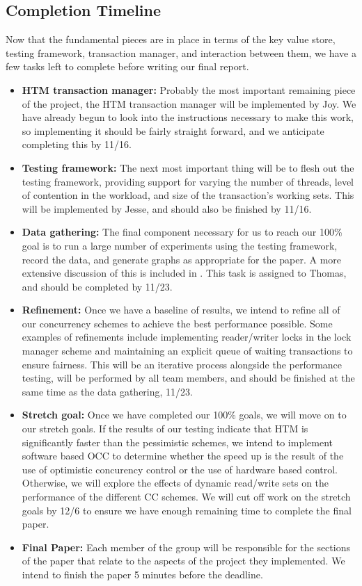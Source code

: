 \subsection{Completion Timeline}
Now that the fundamental pieces are in place in terms of the key value store, 
testing framework, transaction manager, and interaction between them, we have 
a few tasks left to complete before writing our final report.
\begin{itemize}
\item \textbf{HTM transaction manager:} Probably the most important remaining 
piece of the project, the HTM transaction manager will be implemented by Joy. 
We have already begun to look into the instructions necessary to make this 
work, so implementing it should be fairly straight forward, and we anticipate 
completing this by 11/16.
\item \textbf{Testing framework:} The next most important thing will be to 
flesh out the testing framework, providing support for varying the number of 
threads, level of contention in the workload, and size of the transaction's 
working sets. This will be implemented by Jesse, and should also be finished by 
11/16.
\item \textbf{Data gathering:} The final component necessary for us to reach 
our 100\% goal is to run a large number of experiments using the testing 
framework, record the data, and generate graphs as appropriate for the paper. 
A more extensive discussion of this is included in . This task 
is assigned to Thomas, and should be completed by 11/23.
\item \textbf{Refinement:} Once we have a baseline of results, we intend to 
refine all of our concurrency schemes to achieve the best performance possible. 
Some examples of refinements include implementing reader/writer locks in the 
lock manager scheme and maintaining an explicit queue of waiting transactions 
to ensure fairness. This will be an iterative process alongside the performance 
testing, will be performed by all team members, and should be finished at the 
same time as the data gathering, 11/23.
\item \textbf{Stretch goal:} Once we have completed our 100\% goals, we will 
move on to our stretch goals. If the results of our testing indicate that HTM 
is significantly faster than the pessimistic schemes, we intend to implement 
software based OCC to determine whether the speed up is the result of the use 
of optimistic concurency control or the use of hardware based control. 
Otherwise, we will explore the effects of dynamic read/write sets on the 
performance of the different CC schemes. We will cut off work on the stretch 
goals by 12/6 to ensure we have enough remaining time to complete the final 
paper.
\item \textbf{Final Paper:} Each member of the group will be responsible for 
the sections of the paper that relate to the aspects of the project they 
implemented. We intend to finish the paper 5 minutes before the deadline.
\end{itemize}


